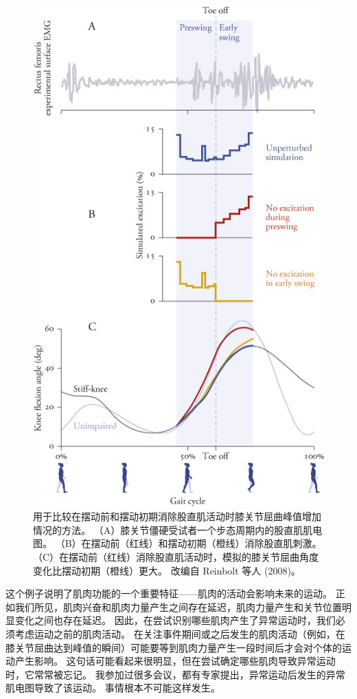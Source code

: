 \begin{figure}[!htb]
	\centering
	\includegraphics[width=0.75\linewidth]{chap11/11_6}
	\caption{用于比较在摆动前和摆动初期消除股直肌活动时膝关节屈曲峰值增加情况的方法。
		（A）膝关节僵硬受试者一个步态周期内的股直肌肌电图。
		（B）在摆动前（红线）和摆动初期（橙线）消除股直肌刺激。
		（C）在摆动前（红线）消除股直肌活动时，模拟的膝关节屈曲角度变化比摆动初期（橙线）更大。
		改编自 Reinbolt 等人 (2008)。 \label{fig:11_6}}
\end{figure}


这个例子说明了肌肉功能的一个重要特征——肌肉的活动会影响未来的运动。
正如我们所见，肌肉兴奋和肌肉力量产生之间存在延迟，肌肉力量产生和关节位置明显变化之间也存在延迟。
因此，在尝试识别哪些肌肉产生了异常运动时，我们必须考虑运动之前的肌肉活动。
在关注事件期间或之后发生的肌肉活动（例如，在膝关节屈曲达到峰值的瞬间）可能要等到肌肉力量产生一段时间后才会对个体的运动产生影响。
这句话可能看起来很明显，但在尝试确定哪些肌肉导致异常运动时，它常常被忘记。
我参加过很多会议，都有专家提出，异常运动后发生的异常肌电图导致了该运动。
事情根本不可能这样发生。


